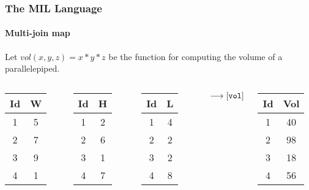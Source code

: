 \documentclass{beamer}
\begin{document}
\begin{frame}
  \frametitle{The MIL Language}
  \framesubtitle{Multi-join map}

\begin{center}
Let \alert{$vol(x,y,z)=x*y*z$} be the function for computing the volume of a parallelepiped.
\end{center}

  \begin{columns}

  \column{1cm}

  \begin{tabular}{|c|c|}
    \hline
    Id & W \\
    \hline
    1 & 5 \\
    2 & 7 \\
    3 & 9 \\
    4 & 1 \\
    \hline
  \end{tabular}

  \column{1cm}

  \begin{tabular}{|c|c|}
    \hline
    Id & H \\
    \hline
    1 & 2 \\
    2 & 6 \\
    3 & 1 \\
    4 & 7 \\
    \hline
  \end{tabular}

  \column{1cm}

  \begin{tabular}{|c|c|}
    \hline
    Id & L \\
    \hline
    1 & 4 \\
    2 & 2 \\
    3 & 2 \\
    4 & 8 \\
    \hline
  \end{tabular}



  \column{1cm}

  $\longrightarrow{\tt [vol]}$

  \column{1cm}

  \begin{tabular}{|c|c|}
    \hline
    Id & Vol \\
    \hline
    1 & 40 \\
    2 & 98 \\
    3 & 18 \\
    4 & 56 \\
    \hline
  \end{tabular}

  \end{columns}

\end{frame}
\end{document}
